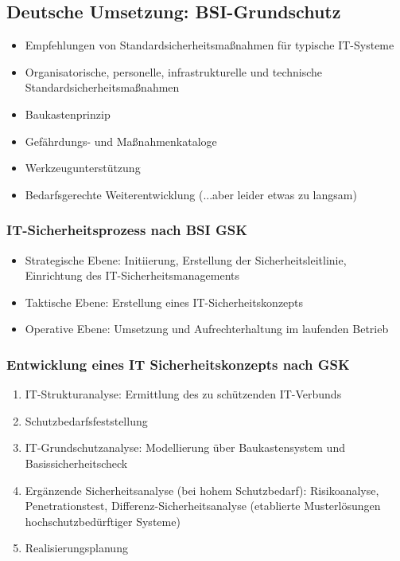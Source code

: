 \subsection{Deutsche Umsetzung: BSI-Grundschutz}
\begin{itemize}
	\item Empfehlungen von Standardsicherheitsmaßnahmen für typische IT-Systeme
	\item Organisatorische, personelle, infrastrukturelle und technische Standardsicherheitsmaßnahmen
	\item Baukastenprinzip
	\item Gefährdungs- und Maßnahmenkataloge
	\item Werkzeugunterstützung
	\item Bedarfsgerechte Weiterentwicklung (...aber leider etwas zu langsam)
\end{itemize}

\subsubsection{IT-Sicherheitsprozess nach BSI GSK}
\begin{itemize}
	\item Strategische Ebene: Initiierung, Erstellung der Sicherheitsleitlinie, Einrichtung des IT-Sicherheitsmanagements
	\item Taktische Ebene: Erstellung eines IT-Sicherheitskonzepts
	\item Operative Ebene: Umsetzung und Aufrechterhaltung im laufenden Betrieb
\end{itemize}

\subsubsection{Entwicklung eines IT Sicherheitskonzepts nach GSK}
\begin{enumerate}
	\item IT-Strukturanalyse: Ermittlung des zu schützenden IT-Verbunds
	\item Schutzbedarfsfeststellung
	\item IT-Grundschutzanalyse: Modellierung über Baukastensystem und Basissicherheitscheck
	\item Ergänzende Sicherheitsanalyse (bei hohem Schutzbedarf): Risikoanalyse, Penetrationstest, Differenz-Sicherheitsanalyse (etablierte Musterlösungen hochschutzbedürftiger Systeme)
	\item Realisierungsplanung
\end{enumerate}

